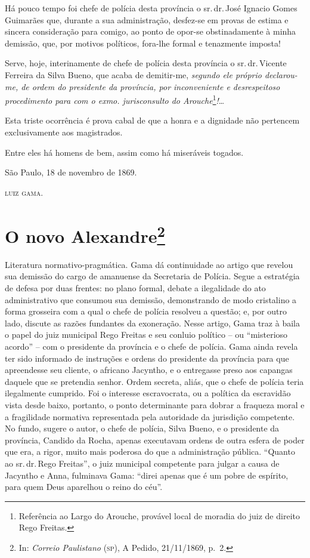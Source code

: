 Há pouco tempo foi chefe de polícia desta província o sr.\,dr.\,José
Ignacio Gomes Guimarães que, durante a sua administração, desfez-se em
provas de estima e sincera consideração para comigo, ao ponto de opor-se
obstinadamente à minha demissão, que, por motivos políticos, fora-lhe
formal e tenazmente imposta!

Serve, hoje, interinamente de chefe de polícia desta província o sr.\,dr.\,Vicente Ferreira da Silva Bueno, que acaba de demitir-me, \emph{segundo
ele próprio declarou-me, de ordem do presidente da província, por
inconveniente e desrespeitoso procedimento para com o exmo.
jurisconsulto do Arouche}\footnote{Referência ao Largo do Arouche,
  provável local de moradia do juiz de direito Rego Freitas.}\emph{!}\ldots{}

Esta triste ocorrência é prova cabal de que a honra e a dignidade não
pertencem exclusivamente aos magistrados.

Entre eles há homens de bem, assim como há miseráveis togados.
\begin{flushright}
São Paulo, 18 de novembro de 1869.

\textsc{luiz gama}.
\end{flushright}
\chapter{O novo Alexandre\footnote{In: \emph{Correio Paulistano} (\textsc{sp}), A
  Pedido, 21/11/1869, p.~2.}}

\begin{didascalia}
Literatura normativo-pragmática. Gama dá continuidade ao artigo que
revelou sua demissão do cargo de amanuense da Secretaria de Polícia.
Segue a estratégia de defesa por duas frentes: no plano formal, debate a
ilegalidade do ato administrativo que consumou sua demissão,
demonstrando de modo cristalino a forma grosseira com a qual o chefe de
polícia resolveu a questão; e, por outro lado, discute as razões
fundantes da exoneração. Nesse artigo, Gama traz à baila o papel do juiz
municipal Rego Freitas e seu conluio político -- ou ``misterioso acordo''
-- com o presidente da província e o chefe de polícia. Gama ainda revela
ter sido informado de instruções e ordens do presidente da província
para que apreendesse seu cliente, o africano Jacyntho, e o entregasse
preso aos capangas daquele que se pretendia senhor. Ordem secreta,
aliás, que o chefe de polícia teria ilegalmente cumprido. Foi o
interesse escravocrata, ou a política da escravidão vista desde baixo,
portanto, o ponto determinante para dobrar a fraqueza moral e a
fragilidade normativa representada pela autoridade da jurisdição
competente. No fundo, sugere o autor, o chefe de polícia, Silva Bueno, e
o presidente da província, Candido da Rocha, apenas executavam ordens de
outra esfera de poder que era, a rigor, muito mais poderosa do que a
administração pública. ``Quanto ao sr.\,dr.\,Rego Freitas'', o juiz
municipal competente para julgar a causa de Jacyntho e Anna, fulminava
Gama: ``direi apenas que é um pobre de espírito, para quem Deus aparelhou
o reino do céu''.
\end{didascalia}




